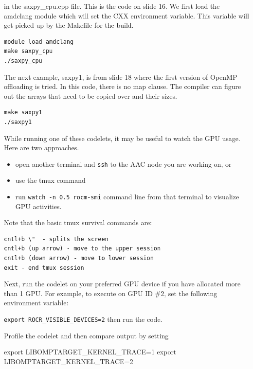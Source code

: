 \documentclass[
]{article}
\let\oldtexttt\texttt
\renewcommand{\texttt}[1]{
  \colorbox{Light}{\oldtexttt{#1}}
}
\newenvironment{Shaded}{}{}
\newcommand{\BuiltInTok}[1]{#1}
\newcommand{\NormalTok}[1]{#1}
\newcommand{\VariableTok}[1]{\textcolor[rgb]{0.10,0.09,0.49}{#1}}
\begin{document}
in the saxpy\_cpu.cpp file. This is the code on slide 16. We first load
the amdclang module which will set the CXX environment variable. This
variable will get picked up by the Makefile for the build.

\begin{verbatim}
module load amdclang
make saxpy_cpu
./saxpy_cpu
\end{verbatim}

The next example, saxpy1, is from slide 18 where the first version of
OpenMP offloading is tried. In this code, there is no map clause. The
compiler can figure out the arrays that need to be copied over and their
sizes.

\begin{verbatim}
make saxpy1
./saxpy1
\end{verbatim}

While running one of these codelets, it may be useful to watch the GPU
usage. Here are two approaches.

\begin{itemize}
\item
  open another terminal and \texttt{ssh} to the AAC node you are working
  on, or
\item
  use the tmux command
\item
  run \texttt{watch\ -n\ 0.5\ rocm-smi} command line from that terminal
  to visualize GPU activities.
\end{itemize}

Note that the basic tmux survival commands are:

\begin{verbatim}
cntl+b \"  - splits the screen
cntl+b (up arrow) - move to the upper session
cntl+b (down arrow) - move to lower session
exit - end tmux session
\end{verbatim}

Next, run the codelet on your preferred GPU device if you have allocated
more than 1 GPU. For example, to execute on GPU ID \#2, set the
following environment variable:
\texttt{export\ ROCR\_VISIBLE\_DEVICES=2} then run the code.

Profile the codelet and then compare output by setting

\begin{Shaded}
\begin{Highlighting}[]
\BuiltInTok{export} \VariableTok{LIBOMPTARGET\_KERNEL\_TRACE=}\NormalTok{1}
\BuiltInTok{export} \VariableTok{LIBOMPTARGET\_KERNEL\_TRACE=}\NormalTok{2}
\end{Highlighting}
\end{Shaded}
\end{document}
